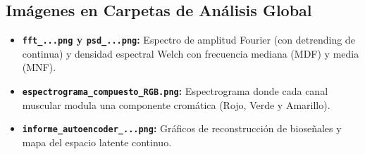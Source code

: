\documentclass[11pt,a4paper]{article}
\begin{document}
\subsection{Imágenes en Carpetas de Análisis Global}
\begin{itemize}[leftmargin=*, itemsep=4pt]
    \item \textbf{\texttt{fft\_...png} y \texttt{psd\_...png}:} Espectro de amplitud Fourier (con detrending de continua) y densidad espectral Welch con frecuencia mediana (MDF) y media (MNF).
    \item \textbf{\texttt{espectrograma\_compuesto\_RGB.png}:} Espectrograma donde cada canal muscular modula una componente cromática (Rojo, Verde y Amarillo).
    \item \textbf{\texttt{informe\_autoencoder\_...png}:} Gráficos de reconstrucción de bioseñales y mapa del espacio latente continuo.
\end{itemize}
\end{document}
